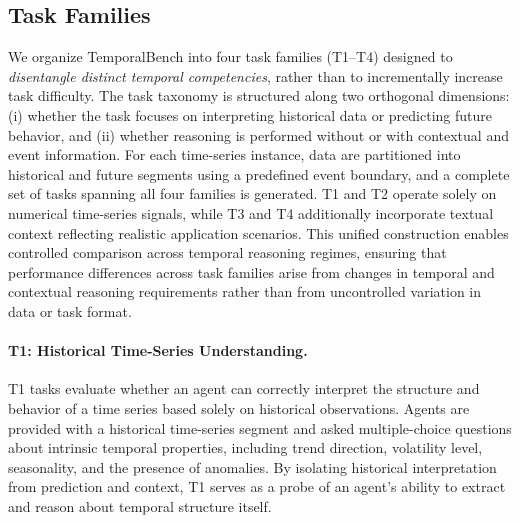 \begin{table}[htbp]
\caption{
Comparison of TemporalBench  with existing temporal and time-series related benchmarks.
TS-Involved indicates whether real numerical time-series are included.
Context indicates whether external contextual information is explicitly incorporated.
}

\vspace{-0.8cm}
\label{tab:ts-benchmarks-comparison}
\end{table}



\subsection{Task Families}
We organize TemporalBench into four task families (T1--T4) designed to \emph{disentangle distinct temporal competencies}, rather than to incrementally increase task difficulty.
The task taxonomy is structured along two orthogonal dimensions:
(i) whether the task focuses on interpreting historical data or predicting future behavior, and
(ii) whether reasoning is performed without or with contextual and event information.
For each time-series instance, data are partitioned into historical and future segments using a predefined event boundary, and a complete set of tasks spanning all four families is generated.
T1 and T2 operate solely on numerical time-series signals, while T3 and T4 additionally incorporate textual context reflecting realistic application scenarios.
This unified construction enables controlled comparison across temporal reasoning regimes, ensuring that performance differences across task families arise from changes in temporal and contextual reasoning requirements rather than from uncontrolled variation in data or task format.


\paragraph{T1: Historical Time-Series Understanding.}
T1 tasks evaluate whether an agent can correctly interpret the structure and behavior of a time series based solely on historical observations.
Agents are provided with a historical time-series segment and asked multiple-choice questions about intrinsic temporal properties, including trend direction, volatility level, seasonality, and the presence of anomalies.
By isolating historical interpretation from prediction and context, T1 serves as a probe of an agent’s ability to extract and reason about temporal structure itself.


